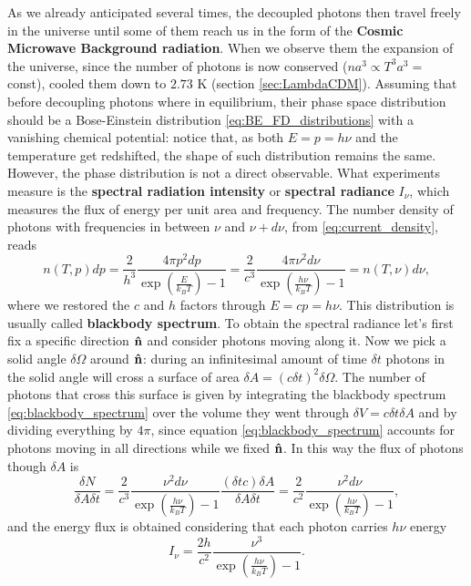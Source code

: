 As we already anticipated several times, the decoupled photons then travel freely in the universe until some of them reach us in the form of the \textbf{Cosmic Microwave Background radiation}. When we observe them the expansion of the universe, since the number of photons is now conserved ($na^{3}\propto T^3a^{3}=$ const), cooled them down to $2.73$ K (section \ref{sec:LambdaCDM}). Assuming that before decoupling photons where in equilibrium, their phase space distribution should be a Bose-Einstein distribution \eqref{eq:BE_FD_distributions} with a vanishing chemical potential: notice that, as  both $E=p=h\nu$ and the temperature get redshifted, the shape of such distribution remains the same. However, the phase distribution is not a direct observable. What experiments measure is the \textbf{spectral radiation intensity} or \textbf{spectral radiance} $I_\nu$, which measures the flux of energy per unit area and frequency. The number density of photons with frequencies in between $\nu$ and $\nu+d\nu$, from \eqref{eq:current_density}, reads 
\begin{equation}
    \label{eq:blackbody_spectrum}
n(T,p)dp=\frac{2}{h^3}\frac{4\pi p^2dp}{\exp(\frac{E}{k_BT})-1}=\frac{2}{c^3}\frac{4\pi \nu^2d\nu}{\exp(\frac{h\nu}{k_BT})-1}=n(T,\nu)d\nu,
\end{equation}
where we restored the $c$ and $h$ factors through $E=cp=h\nu$. This distribution is usually called \textbf{blackbody spectrum}. To obtain the spectral radiance let's first fix a specific direction $\mathbf{\hat{n}}$ and consider photons moving along it. Now we pick a solid angle $\delta \Omega$ around $\mathbf{\hat{n}}$: during an infinitesimal amount of time $\delta t$ photons in the solid angle will cross a surface of area $\delta A = (c\delta t)^2\delta\Omega$. The number of photons that cross this surface is given by integrating the blackbody spectrum \eqref{eq:blackbody_spectrum} over the volume they went through $\delta V=c\delta t\delta A$ and by dividing everything by $4\pi$, since equation \eqref{eq:blackbody_spectrum} accounts for photons moving in all directions while we fixed $\mathbf{\hat{n}}$. In this way the flux of photons though $\delta A$ is
$$
\frac{\delta N}{\delta A\delta t}=\frac{2}{c^3}\frac{ \nu^2d\nu}{\exp(\frac{h\nu}{k_BT})-1}\frac{(\delta t c)\delta A}{\delta A \delta t}=\frac{2}{c^2}\frac{\nu^2d\nu}{\exp(\frac{h\nu}{k_BT})-1},
$$
and the energy flux is obtained considering that each photon carries $h\nu$ energy
\begin{equation}
    I_\nu=\frac{2h}{c^2}\frac{\nu^3}{\exp(\frac{h\nu}{k_BT})-1}.
\end{equation}
